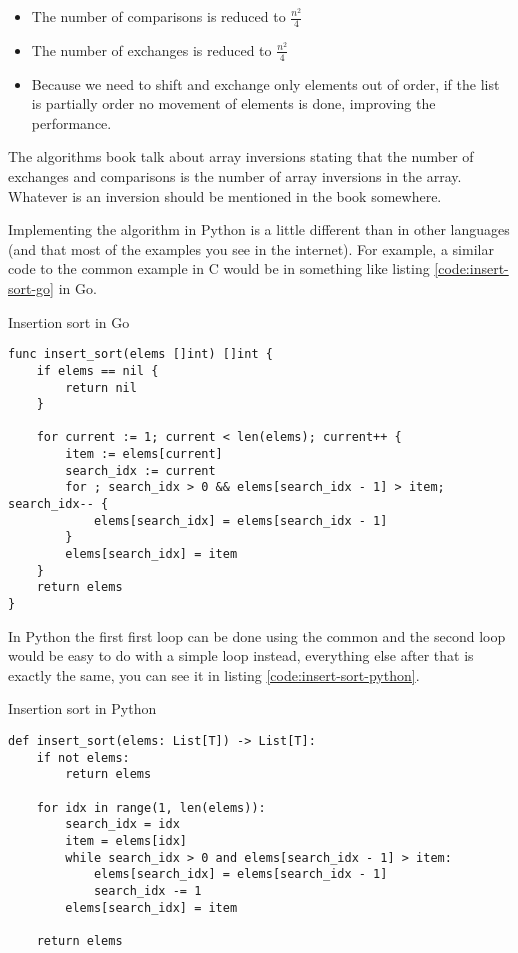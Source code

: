 \documentclass[main.tex]{subfiles}
\begin{document}
\begin{itemize}
    \item The number of comparisons is reduced to $\frac{n^2}{4}$
    \item The number of exchanges is reduced to $\frac{n^2}{4}$
    \item Because we need to shift and exchange only elements out of order, if the list is partially order no movement of elements is done, improving the performance.
\end{itemize}

The algorithms book talk about array inversions stating that the number of exchanges and comparisons is the number of array inversions in the array. Whatever is an inversion should be mentioned in the book somewhere.

Implementing the algorithm in Python is a little different than in other languages (and that most of the examples you see in the internet). For example, a similar code to the common example in C would be in something like listing \ref{code:insert-sort-go} in Go.

\begin{listing}
\caption{Insertion sort in Go}
\label{code:insert-sort-in-go}
\begin{verbatim}
func insert_sort(elems []int) []int {
    if elems == nil {
        return nil
    }
    
    for current := 1; current < len(elems); current++ {
        item := elems[current]
        search_idx := current
        for ; search_idx > 0 && elems[search_idx - 1] > item; search_idx-- {
            elems[search_idx] = elems[search_idx - 1]
        }
        elems[search_idx] = item
    }
    return elems
}
\end{verbatim}
\end{listing}

In Python the first first  loop can be done using the common  and the second loop would be easy to do with a simple  loop instead, everything else after that is exactly the same, you can see it in listing \ref{code:insert-sort-python}.

\begin{listing}
\caption{Insertion sort in Python}
\label{code:insert-sort-python}
\begin{verbatim}
def insert_sort(elems: List[T]) -> List[T]:
    if not elems:
        return elems
    
    for idx in range(1, len(elems)):
        search_idx = idx
        item = elems[idx]
        while search_idx > 0 and elems[search_idx - 1] > item:
            elems[search_idx] = elems[search_idx - 1]
            search_idx -= 1
        elems[search_idx] = item
    
    return elems
\end{verbatim}
\end{listing}
\end{document}
